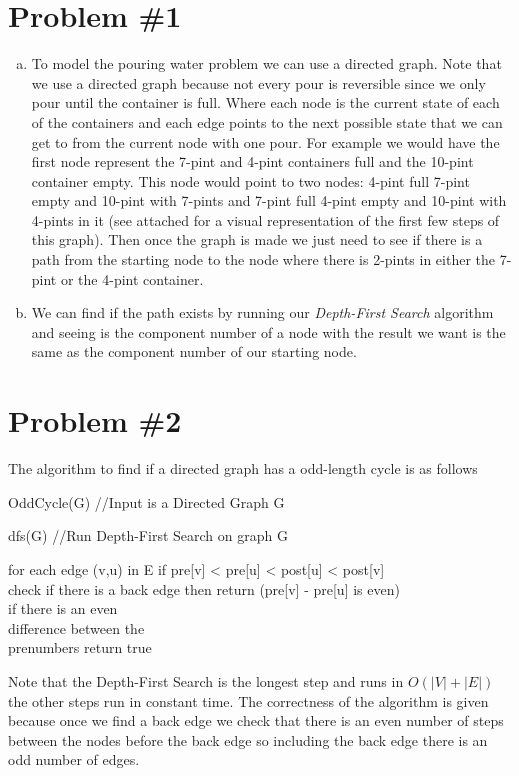 \documentclass[11pt]{article}
\numberwithin{equation}{section}
\begin{document}


\section{Problem \#1}
\begin{enumerate}[(a)]
\item
To model the pouring water problem we can use a directed graph. Note that we use a directed graph because not every pour is reversible since we only pour until the container is full. Where each node is the current state of each of the containers and each edge points to the next possible state that we can get to from the current node with one pour. For example we would have the first node represent the 7-pint and 4-pint containers full and the 10-pint container empty. This node would point to two nodes: 4-pint full 7-pint empty and 10-pint with 7-pints and 7-pint full 4-pint empty and 10-pint with 4-pints in it (see attached for a visual representation of the first few steps of this graph). Then once the graph is made we just need to see if there is a path from the starting node to the node where there is 2-pints in either the 7-pint or the 4-pint container.

\item
We can find if the path exists by running our \emph{Depth-First Search} algorithm and seeing is the component number of a node with the result we want is the same as the component number of our starting node.
\end{enumerate}

\section{Problem \#2}
The algorithm to find if a directed graph has a odd-length cycle is as follows
\begin{verbatimtab}[4]
OddCycle(G) //Input is a Directed Graph G

	dfs(G) //Run Depth-First Search on graph G

	for each edge (v,u) in E
		if pre[v] < pre[u] < post[u] < post[v] \\check if there is a back edge
			then return (pre[v] - pre[u] is even) \\if there is an even 
											   		\\difference between the 
													\\prenumbers return true
\end{verbatimtab}
Note that the Depth-First Search is the longest step and runs in $O(|V|+|E|)$ the other steps run in constant time. The correctness of the algorithm is given because once we find a back edge we check that there is an even number of steps between the nodes before the back edge so including the back edge there is an odd number of edges.
\end{document}
